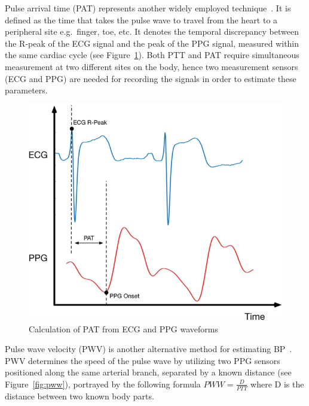 Pulse arrival time (PAT) represents another widely employed technique~\cite{sharmaCuffLessContinuousBlood2017}.
It is defined as the time that takes the pulse wave to travel from the heart to a peripheral site e.g.\ finger, toe, etc.
It denotes the temporal discrepancy between the R-peak of the ECG signal and the peak of the PPG signal, measured within the same cardiac cycle (see Figure~\ref{fig:pat}).
Both PTT and PAT require simultaneous measurement at two different sites on the body, hence two measurement sensors (ECG and PPG) are needed for recording the signals in order to estimate these parameters.
\begin{figure}[h]
    \centering
    \includegraphics[scale=0.4]{images/sp/pat}
    \caption{Calculation of PAT from ECG and PPG waveforms~\cite{dhillonPulseArrivalTime2019}}
    \label{fig:pat}
\end{figure}

Pulse wave velocity (PWV) is another alternative method for estimating BP~\cite{mccombieAdaptiveBloodPressure2006}.
PWV determines the speed of the pulse wave by utilizing two PPG sensors positioned along the same arterial branch, separated by a known distance (see Figure~\ref{fig:pww}), portrayed by the following formula
\begin{math}
    PWW = \frac{D}{PTT}
\end{math}
where D is the distance between two known body parts.

